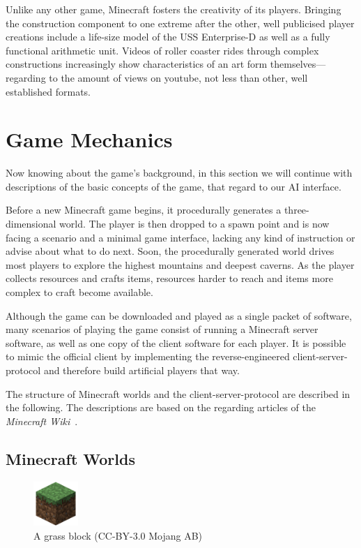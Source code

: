 Unlike any other game, Minecraft fosters the creativity of its players. Bringing the construction component to one extreme after the other, well publicised player creations include a life-size model of the USS Enterprise-D as well as a fully functional arithmetic unit. Videos of roller coaster rides through complex constructions increasingly show characteristics of an art form themselves---regarding to the amount of views on youtube, not less than other, well established formats.

    \section{Game Mechanics}
Now knowing about the game's background, in this section we will continue with descriptions of the basic concepts of the game, that regard to our AI interface. 

Before a new Minecraft game begins, it procedurally generates a three-dimensional world. The player is then dropped to a spawn point and is now facing a scenario and a minimal game interface, lacking any kind of instruction or advise about what to do next. Soon, the procedurally generated world drives most players to explore the highest mountains and deepest caverns. As the player collects resources and crafts items, resources harder to reach and items more complex to craft become available.~\cite{Duncan:2011:MBC:2207096.2207097}

Although the game can be downloaded and played as a single packet of software, many scenarios of playing the game consist of running a Minecraft server software, as well as one copy of the client software for each player. It is possible to mimic the official client by implementing the reverse-engineered client-server-protocol and therefore build artificial players that way.

The structure of Minecraft worlds and the client-server-protocol are described in the following. The descriptions are based on the regarding articles of the \emph{Minecraft Wiki}~\cite{mcwiki}.

    \subsection{Minecraft Worlds}
    

\begin{figure}
  \begin{center}
    \includegraphics[width=0.15\textwidth]{graphics/block}
  \end{center}
  \caption{A grass block (CC-BY-3.0 Mojang AB) \cite{image_mob}}
  \label{mc_block}
\end{figure}

